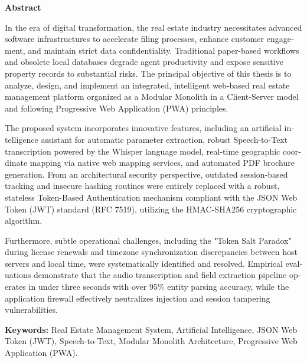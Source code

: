 \documentclass[11pt, a4paper]{report}
\begin{document}
\clearpage
\begin{otherlanguage}{english}

\begin{center}
    {\Large \bfseries Abstract}
\end{center}
\vspace{0.5cm}
In the era of digital transformation, the real estate industry necessitates advanced software infrastructures to accelerate filing processes, enhance customer engagement, and maintain strict data confidentiality. Traditional paper-based workflows and obsolete local databases degrade agent productivity and expose sensitive property records to substantial risks. The principal objective of this thesis is to analyze, design, and implement an integrated, intelligent web-based real estate management platform organized as a Modular Monolith in a Client-Server model and following Progressive Web Application (PWA) principles.

The proposed system incorporates innovative features, including an artificial intelligence assistant for automatic parameter extraction, robust Speech-to-Text transcription powered by the Whisper language model, real-time geographic coordinate mapping via native web mapping services, and automated PDF brochure generation. From an architectural security perspective, outdated session-based tracking and insecure hashing routines were entirely replaced with a robust, stateless Token-Based Authentication mechanism compliant with the JSON Web Token (JWT) standard (RFC 7519), utilizing the HMAC-SHA256 cryptographic algorithm.

Furthermore, subtle operational challenges, including the "Token Salt Paradox" during license renewals and timezone synchronization discrepancies between host servers and local time, were systematically identified and resolved. Empirical evaluations demonstrate that the audio transcription and field extraction pipeline operates in under three seconds with over 95\% entity parsing accuracy, while the application firewall effectively neutralizes injection and session tampering vulnerabilities.

\vspace{1cm}
\noindent \textbf{Keywords:} Real Estate Management System, Artificial Intelligence, JSON Web Token (JWT), Speech-to-Text, Modular Monolith Architecture, Progressive Web Application (PWA).

\begin{titlepage}
    \centering
    \vspace*{0.5cm}


\end{titlepage}
\end{otherlanguage}
\end{document}
